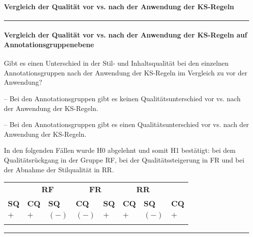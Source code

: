 \paragraph*{Vergleich der Qualität vor vs. nach der Anwendung der KS-Regeln}
\hrule
\paragraph*{Vergleich der Qualität vor vs. nach der Anwendung der KS-Regeln auf Annotationsgruppenebene}
\begin{description}[font=\normalfont\bfseries]
\item [Fragestellung:] Gibt es einen Unterschied in der Stil- und Inhaltsqualität bei den einzelnen Annotationsgruppen nach der Anwendung der KS-Regeln im Vergleich zu vor der Anwendung?
\item[H0] -- Bei den Annotationsgruppen gibt es keinen Qualitätsunterschied vor vs. nach der Anwendung der KS-Regeln.
\item[H1] -- Bei den Annotationsgruppen gibt es einen Qualitätsunterschied vor vs. nach der Anwendung der KS-Regeln.
\item [Resultat] In den folgenden Fällen wurde H0 abgelehnt und somit H1 bestätigt: bei dem Qualitätsrückgang in der Gruppe RF, bei der Qualitätssteigerung in FR und bei der Abnahme der Stilqualität in RR.
\begin{table}[H]
\begin{tabularx}{\textwidth}{XXXXXXXX}
\lsptoprule
\multicolumn{2}{c}{\textbf{FF}} & \multicolumn{2}{c}{\textbf{RF}} & \multicolumn{2}{c}{\textbf{FR}} & \multicolumn{2}{c}{\textbf{RR}}\\
\cmidrule(lr){1-2}\cmidrule(lr){3-4}\cmidrule(lr){5-6}\cmidrule(lr){7-8}
\textbf{SQ} & \textbf{CQ} & \textbf{SQ}  & \textbf{CQ} & \textbf{SQ} & \textbf{CQ} & \textbf{SQ} & \textbf{CQ}\\
\midrule
$+$ & $+$ & \cellcolor{smGreen}$(-)$ & \cellcolor{smGreen}$(-)$ & \cellcolor{smGreen}$+$ & \cellcolor{smGreen}$+$ & \cellcolor{smGreen}$(-)$ & $+$\\
\lspbottomrule
\end{tabularx}
\end{table}
\end{description}
\hrule
